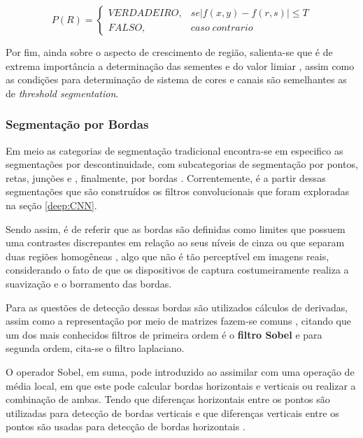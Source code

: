 \begin{equation}
\label{segment:eq:3}
P(R) = \left\{\begin{matrix}
    VERDADEIRO, & se |f(x,y) - f(r,s)| \leq T \\
    FALSO,      &  caso\; contrario
\end{matrix}\right.
\end{equation}

Por fim, ainda sobre o aspecto de crescimento de região, salienta-se que é de extrema importância a determinação das sementes e do valor limiar \cite{Yuheng2017ImageOverview,pedrini2008analise}, assim como as condições para determinação de sistema de cores e canais são semelhantes as de \textit{threshold segmentation}.


\subsubsection{Segmentação por Bordas}

Em meio as categorias de segmentação tradicional encontra-se em especifico as segmentações por descontinuidade, com subcategorias de segmentação por pontos, retas, junções e , finalmente, por bordas \cite{pedrini2008analise}. Correntemente, é a partir dessas segmentações que são construídos os filtros convolucionais que foram exploradas na seção \ref{deep:CNN}.

Sendo assim, é de referir que as bordas são definidas como limites que possuem uma contrastes discrepantes em relação ao seus níveis de cinza  ou que separam duas regiões homogêneas \cite{pedrini2008analise,Yuheng2017ImageOverview}, algo que não é tão perceptível em imagens reais, considerando o fato de que os dispositivos de captura costumeiramente realiza a suavização e o borramento das bordas.

Para as questões de detecção dessas bordas são utilizados cálculos de derivadas, assim  como a representação por meio de matrizes fazem-se comuns \cite{pedrini2008analise, muthukrishnan2011edge}, citando que um dos mais conhecidos filtros de primeira ordem é o \textbf{filtro Sobel} e para segunda ordem, cita-se o filtro laplaciano.

O operador Sobel, em suma, pode introduzido ao assimilar com uma operação de média local, em que este pode calcular bordas horizontais e verticais ou realizar a combinação de ambas. Tendo que diferenças horizontais entre os pontos são utilizadas para detecção de bordas verticais e que diferenças verticais entre os pontos são usadas para detecção de bordas horizontais \cite{pedrini2008analise}.

